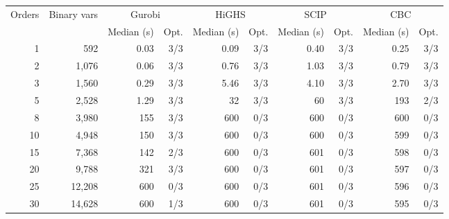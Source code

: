 \begin{tabular}{@{}rrrrrrrrrr@{}}
\toprule
Orders & Binary vars & \multicolumn{2}{c}{Gurobi} & \multicolumn{2}{c}{HiGHS} & \multicolumn{2}{c}{SCIP} & \multicolumn{2}{c}{CBC} \\
 & & Median (s) & Opt. & Median (s) & Opt. & Median (s) & Opt. & Median (s) & Opt. \\
\midrule
1 & 592 & 0.03 & 3/3 & 0.09 & 3/3 & 0.40 & 3/3 & 0.25 & 3/3 \\
2 & 1,076 & 0.06 & 3/3 & 0.76 & 3/3 & 1.03 & 3/3 & 0.79 & 3/3 \\
3 & 1,560 & 0.29 & 3/3 & 5.46 & 3/3 & 4.10 & 3/3 & 2.70 & 3/3 \\
5 & 2,528 & 1.29 & 3/3 & 32 & 3/3 & 60 & 3/3 & 193 & 2/3 \\
8 & 3,980 & 155 & 3/3 & 600 & 0/3 & 600 & 0/3 & 600 & 0/3 \\
10 & 4,948 & 150 & 3/3 & 600 & 0/3 & 600 & 0/3 & 599 & 0/3 \\
15 & 7,368 & 142 & 2/3 & 600 & 0/3 & 601 & 0/3 & 598 & 0/3 \\
20 & 9,788 & 321 & 3/3 & 600 & 0/3 & 601 & 0/3 & 597 & 0/3 \\
25 & 12,208 & 600 & 0/3 & 600 & 0/3 & 601 & 0/3 & 596 & 0/3 \\
30 & 14,628 & 600 & 1/3 & 600 & 0/3 & 601 & 0/3 & 595 & 0/3 \\
\bottomrule
\end{tabular}
